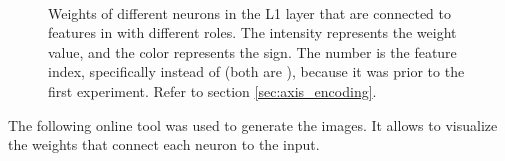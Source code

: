 \begin{figure}[H]
\qquad
{}
\qquad
{} \\

\caption{Weights of different neurons in the L1 layer that are connected to features in  with different roles. The intensity represents the weight value, and the color represents the sign. The number is the feature index, specifically  instead of  (both are ), because it was prior to the first experiment. Refer to section \ref{sec:axis_encoding}.}
\end{figure}

The following online tool was used to generate the images. It allows to visualize the weights that connect each neuron to the input. \\

